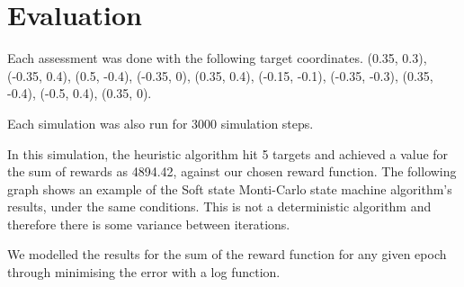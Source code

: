 \section{Evaluation}
Each assessment was done with the following target coordinates.
(0.35, 0.3), (-0.35, 0.4), (0.5, -0.4), (-0.35, 0), (0.35, 0.4), (-0.15, -0.1), (-0.35, -0.3), (0.35, -0.4), (-0.5, 0.4), (0.35, 0).

Each simulation was also run for 3000 simulation steps.

In this simulation, the heuristic algorithm hit 5 targets and achieved a value for the sum of rewards as 4894.42, against our chosen reward function.
The following graph shows an example of the Soft state Monti-Carlo state machine algorithm’s results, under the same conditions. This is not a deterministic algorithm and therefore there is some variance  between iterations.

We modelled the results for the sum of the reward function for any given epoch through minimising the error with a log function.


